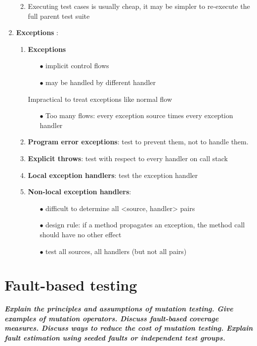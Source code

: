 \documentclass{article}
\begin{document}
\begin{enumerate}
\begin{enumerate}
\begin{itemize}
    \end{itemize}
    \item Executing test cases is usually cheap, it may be simpler to re-execute the full parent test suite\\
\end{enumerate}
\item \textbf{Exceptions} : 
\begin{enumerate}
    \item \textbf{Exceptions} 

\begin{itemize}
    \item [$\bullet$] implicit control flows

    \item [$\bullet$]may be handled by different handler
\end{itemize}

Impractical to treat exceptions like normal flow
\begin{itemize}
    \item [$\bullet$]Too many flows: every exception source times every exception handler
\end{itemize}
 \item\textbf{Program error exceptions}: test to prevent them, not to handle them.
 
 \item \textbf{Explicit throws}: test with respect to every handler on call stack
  
\item \textbf{Local exception handlers}: test the exception handler

\item \textbf{Non-local exception handlers}:
\begin{itemize}
    \item [$\bullet$]difficult to determine all <source, handler> pairs
    \item [$\bullet$]design rule: if a method propagates an exception, the method call should have no other
effect
    \item [$\bullet$]test all sources, all handlers (but not all pairs)
\end{itemize}
\end{enumerate}
\end{enumerate}



\newpage
\section{Fault-based testing}
\textbf{\textit{Explain the principles and assumptions of mutation testing. Give examples of mutation operators. Discuss fault-based coverage measures. Discuss ways to reduce the cost of mutation testing. Explain fault estimation using seeded faults or independent test groups.}}
\end{document}
